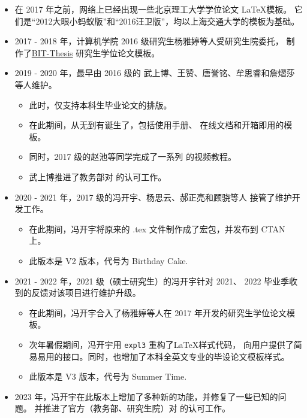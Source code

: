 \begin{appendices}
\begin{itemize}[nosep]
  \item 在 2017 年之前，网络上已经出现一些北京理工大学学位论文 \LaTeX 模板。
    它们是“2012大眼小蚂蚁版”和“2016汪卫版”，均以上海交通大学的模板为基础。
  \item 2017 - 2018 年，计算机学院 2016 级研究生杨雅婷等人受研究生院委托，
    制作了\href{https://github.com/BIT-thesis/LaTeX-template}{BIT-Thesis} 
    研究生学位论文模板。
  \item 2019 - 2020 年，\BIThesis 最早由 2016 级的
    武上博、王赞、唐誉铭、牟思睿和詹熠莎等人维护。
    \begin{itemize}[nosep]
    \item 此时，\BIThesis 仅支持本科生毕业论文的排版。
    \item 在此期间，\BIThesis 从无到有诞生了，包括使用手册、
      在线文档和开箱即用的模板。
    \item 同时，2017 级的赵池等同学完成了一系列 \BIThesis 
      的视频教程。
    \item 武上博推进了教务部对 \BIThesis{} 的认可工作。
  \end{itemize}
  \item 2020 - 2021 年，2017 级的冯开宇、杨思云、郝正亮和顾骁等人
      接管了维护开发工作。
  \begin{itemize}[nosep]
    \item 在此期间，冯开宇将原来的 .tex 文件制作成了宏包，并发布到 CTAN 上。
    \item 此版本是 V2 版本，代号为 Birthday Cake.
  \end{itemize}
  \item 2021 - 2022 年，2021 级（硕士研究生）的冯开宇针对 2021、
      2022 毕业季收到的反馈对该项目进行维护升级。
  \begin{itemize}[nosep]
    \item 在此期间，冯开宇合入了杨雅婷等人在 2017 年开发的研究生学位论文模板。
    \item 次年暑假期间，冯开宇用 \verb|expl3| 重构了\LaTeX 样式代码，
      向用户提供了简易易用的接口。同时，也增加了本科全英文专业的毕设论文模板样式。
    \item 此版本是 V3 版本，代号为 Summer Time.
  \end{itemize}
  \item 2023 年，冯开宇在此版本上增加了多种新的功能，并修复了一些已知的问题。
  并推进了官方（教务部、研究生院）对 \BIThesis 的认可工作。
\end{itemize}

\end{appendices}
